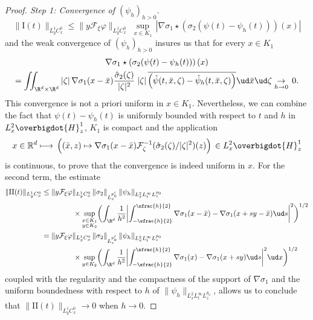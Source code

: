 \begin{proof}[Proof. Step 1: Convergence of $(\psi_{h})_{h>0}$]
\[
\|\mathrm{I}(t)\|_{L_{y}^{1}C_{x}^{0}}\leq\|y\mathcal{F}_{\xi}\varphi\|_{L_{y}^{1}C_{x}^{0}}\;\underset{x\in K_{1}}{\sup}\,\left|\nabla\sigma_{1}\star\left(\sigma_{2}(\psi(t)-\psi_{h}(t))\right)(x)\right|
\]
and the weak convergence of $(\psi_{h})_{h>0}$ insures us that for every $x\in K_1$
\begin{multline*}
\nabla\sigma_{1}\star\left(\sigma_{2}(\psi(t)-\psi_{h}(t))\right)(x)\\
=\iint_{\R^{d}\times\R^{d}}|\zeta|\,\nabla\sigma_{1}(x-\bar{x})\frac{\hat{\sigma}_{2}(\zeta)}{|\zeta|^{2}}\;|\zeta|\,\overline{\left(\hat{\psi}(t,\bar{x},\zeta)-\hat{\psi}_{h}(t,\bar{x},\zeta)\right)}
\ud \bar x \ud\zeta\underset{h\to 0}{\to}\,0.
\end{multline*}
This convergence is not a priori uniform in $x\in K_1$. Nevertheless, we can combine the fact that $\psi(t)-\psi_{h}(t)$ is uniformly bounded with respect to $t$ and $h$ in $L_{x}^{2}\overbigdot{H}_{z}^{1}$, $K_1$ is compact and the application
\[
x\in\mathbb R^d \longmapsto\,\left((\bar{x},z)\mapsto\nabla\sigma_{1}(x-\bar{x})\mathcal{F}_{\zeta}^{-1}(\hat{\sigma}_{2}(\zeta)/|\zeta|^{2})(z)\right)\,\in L_{x}^{2}\overbigdot{H}_{z}^{1}
\]
is continuous,
to prove that the convergence is indeed uniform in $x$. For the second term, the estimate\enlargethispage{-\baselineskip}
\begin{align*}
\|\mathrm{II}(t)\|_{L_{y}^{1}C_{x}^{0}}&\leq \|y\mathcal{F}_{\xi}\varphi\|_{L_{y}^{1}C_{x}^{0}}\,\|\sigma_{2}\|_{L_{z}^{p_{0}'}}\,\|\psi_{h}\|_{L_{x}^{2}L_{t}^{\infty}L_{z}^{p_{0}}}\\
&\hspace*{1.5cm}\times\underset{\substack{x\in K_{1} \\ y\in K_{2}}}{\sup}\biggl(\int_{\R^{d}}\frac{1}{h^{2}}\biggl|\int_{-\sfrac{h}{2}}^{\sfrac{h}{2}}\nabla\sigma_{1}(x-\bar{x})-\nabla\sigma_{1}(x+sy-\bar{x})\ud s\biggr|^{2}\biggr)^{1/2}\\
&=\|y\mathcal{F}_{\xi}\varphi\|_{L_{y}^{1}C_{x}^{0}}\,\|\sigma_{2}\|_{L_{z}^{p_{0}'}}\,\|\psi_{h}\|_{L_{x}^{2}L_{t}^{\infty}L_{z}^{p_{0}}}\\
&\hspace*{1.5cm}\times \underset{y\in K_{2}}{\sup}\biggl(\int_{\R^{d}}\frac{1}{h^{2}}\biggl|\int_{-\sfrac{h}{2}}^{\sfrac{h}{2}}\nabla\sigma_{1}(x)-\nabla\sigma_{1}(x+sy)\ud s\biggr|^{2}\ud x\biggr)^{1/2}
\end{align*}
coupled with the regularity and the compactness of the support of $\nabla\sigma_{1}$ and the uniform boundedness with respect to $h$ of $\|\psi_{h}\|_{L_{x}^{2}L_{t}^{\infty}L_{z}^{p_{0}}}$, allows us to conclude that $\|\mathrm{II}(t)\|_{L_{y}^{1}C_{x}^{0}}\to 0$ when $h\to 0$.


\end{proof}
